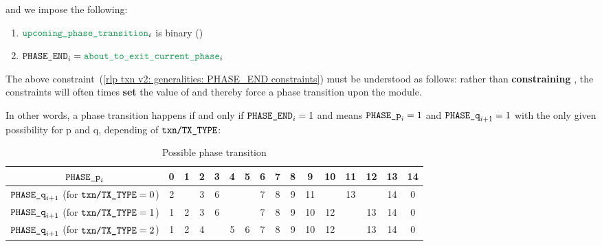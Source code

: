 and we impose the following:
\begin{enumerate}
    \item
        $\locValidPhaseTransition _{i}$ is binary \quad (\sanityCheck)
    \item \label{rlp txn v2: generalities: PHASE_END constraints}
        $\phaseEnd_{i} = \locAboutToExitPhase _{i}$
\end{enumerate}
\saNote{}
The above constraint~(\ref{rlp txn v2: generalities: PHASE_END constraints})
must be understood as follows: rather than \textbf{constraining} \phaseEnd{},
the constraints will often times \textbf{set} the value of \phaseEnd{} and thereby force a phase transition upon the module.

In other words, a phase transition happens if and only if $\texttt{PHASE\_END}_{i} = 1$ and means $\texttt{PHASE\_p}_{i} = 1$ and $\texttt{PHASE\_q}_{i + 1} = 1$ with the only given possibility for p and q, depending of $\texttt{txn}\texttt{/}\texttt{{TX\_TYPE}}$:
\begin{table}[h]
    \centering
    \renewcommand{\arraystretch}{1.5}
    \begin{tabular}{|c|c|c|c|c|c|c|c|c|c|c|c|c|c|c|c|} \hline
        $\texttt{PHASE\_p}_{i}$                                                & 0 & 1 & 2 & 3 & 4 & 5 & 6 & 7 & 8 & 9  & 10 & 11 & 12 & 13 & 14 \\ \hline \hline
        $\texttt{PHASE\_q}_{i + 1}$ (for $\texttt{txn}\texttt{/}\texttt{{TX\_TYPE}} = 0$) & 2 &   & 3 & 6 &   &   & 7 & 8 & 9 & 11 &    & 13 &    & 14 & 0  \\ \hline
        $\texttt{PHASE\_q}_{i + 1}$ (for $\texttt{txn}\texttt{/}\texttt{{TX\_TYPE}} = 1$) & 1 & 2 & 3 & 6 &   &   & 7 & 8 & 9 & 10 & 12 &    & 13 & 14 & 0  \\ \hline
        $\texttt{PHASE\_q}_{i + 1}$ (for $\texttt{txn}\texttt{/}\texttt{{TX\_TYPE}} = 2$) & 1 & 2 & 4 &   & 5 & 6 & 7 & 8 & 9 & 10 & 12 &    & 13 & 14 & 0  \\ \hline
    \end{tabular}
    \caption{Possible phase transition}
    \label{tab:Possible phase transition}
\end{table}
